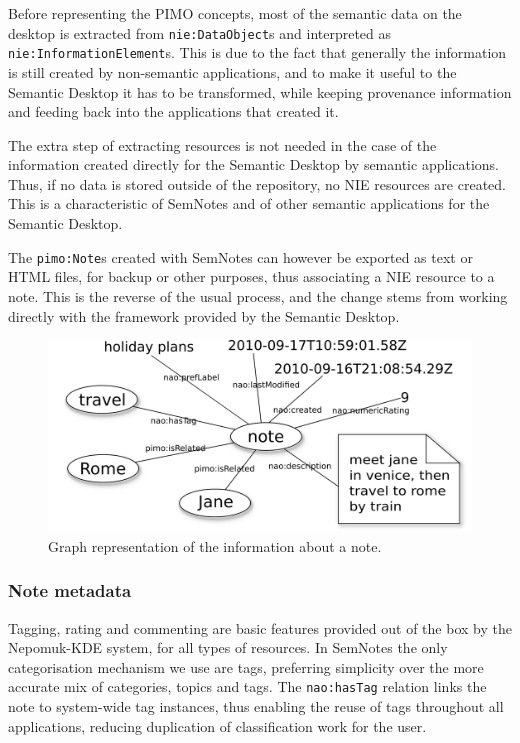 Before representing the PIMO concepts, most of the semantic data on the desktop is extracted from \verb|nie:DataObject|s and interpreted as \verb|nie:InformationElement|s. This is due to the fact that generally the information is still created by non-semantic applications, and to make it useful to the Semantic Desktop it has to be transformed, while keeping provenance information and feeding back into the applications that created it.

The extra step of extracting resources is not needed in the case of the information created directly for the Semantic Desktop by semantic applications. Thus, if no data is stored outside of the repository, no NIE resources are created. This is a characteristic of SemNotes and of other semantic applications for the Semantic Desktop.

The \verb|pimo:Note|s created with SemNotes can however be exported as text or HTML files, for backup or other purposes, thus associating a NIE resource to a note. This is the reverse of the usual process, and the change stems from working directly with the framework provided by the Semantic Desktop.

\begin{figure}[th]
 \includegraphics[width=0.9\linewidth]{chapters/core/img/note-properties}
\caption{Graph representation of the information about a note.}
\label{fig:holiday}
\end{figure} 

\subsubsection{Note metadata}

Tagging, rating and commenting are basic features provided out of the box by the Nepomuk-KDE system, for all types of resources. 
In SemNotes the only categorisation mechanism we use are tags, preferring simplicity over the more accurate mix of categories, topics and tags. The \verb|nao:hasTag| relation links the note to system-wide tag instances, thus enabling the reuse of tags throughout all applications, reducing duplication of classification work for the user. 

